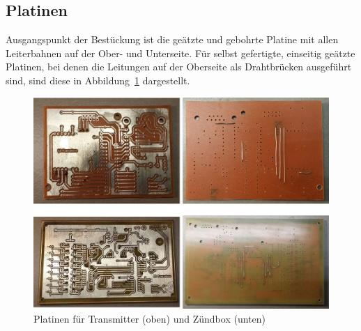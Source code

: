 \documentclass[paper=a4, parskip, numbers=noenddot, toc=listof, headsepline]{scrbook}
\begin{document}
				\subsection{Platinen}

					Ausgangspunkt der Bestückung ist die geätzte und gebohrte Platine mit allen Leiterbahnen auf der Ober- und Unterseite. Für selbst gefertigte, einseitig geätzte Platinen, bei denen die Leitungen auf der Oberseite als Drahtbrücken ausgeführt sind, sind diese in Abbildung~\ref{fig:platinen} dargestellt.

					\begin{figure}[t]
						\centering
						\includegraphics[width=\textwidth]{bilder/platinen}
						\caption{Platinen für Transmitter (oben) und Zündbox (unten)}
						\label{fig:platinen}
					\end{figure}
\end{document}
